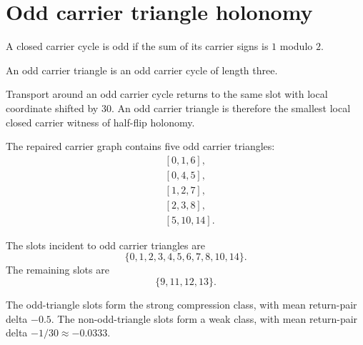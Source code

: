 \section{Odd carrier triangle holonomy}

\begin{definition}
A closed carrier cycle is odd if the sum of its carrier signs is \(1\) modulo \(2\).
\end{definition}

\begin{definition}
An odd carrier triangle is an odd carrier cycle of length three.
\end{definition}

Transport around an odd carrier cycle returns to the same slot with local coordinate shifted by 30. An odd carrier triangle is therefore the smallest local closed carrier witness of half-flip holonomy.

The repaired carrier graph contains five odd carrier triangles:
\[
\begin{aligned}
&[0,1,6],\\
&[0,4,5],\\
&[1,2,7],\\
&[2,3,8],\\
&[5,10,14].
\end{aligned}
\]

The slots incident to odd carrier triangles are
\[
    \{0,1,2,3,4,5,6,7,8,10,14\}.
\]
The remaining slots are
\[
    \{9,11,12,13\}.
\]

The odd-triangle slots form the strong compression class, with mean return-pair delta \(-0.5\). The non-odd-triangle slots form a weak class, with mean return-pair delta \(-1/30 \approx -0.0333\).
